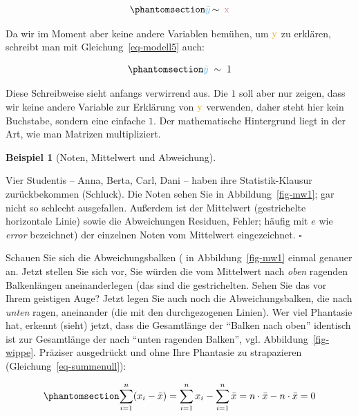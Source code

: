 \documentclass[
  letterpaper,
  oneside,
  open=any]{scrbook}
\theoremstyle{definition}
\theoremstyle{definition}
\newtheorem{example}{Beispiel}[chapter]
\theoremstyle{definition}
\theoremstyle{remark}
\begin{document}
\begin{equation}\phantomsection\label{eq-modell5a}{\color{modelcol}{\bar{y}} \color{black}  {\, \sim \,} \color{xcol}{\text{ x}}}\end{equation}

Da wir im Moment aber keine andere Variablen bemühen, um
\(\color{ycol}{\text{y}}\) zu erklären, schreibt man mit
Gleichung~\ref{eq-modell5} auch:

\begin{equation}\phantomsection\label{eq-modell5}{\color{modelcol}{\bar{y}}\;\;  \color{black}{\sim \; 1}}\end{equation}

Diese Schreibweise sieht anfangs verwirrend aus. Die \(1\) soll aber nur
zeigen, dass wir keine andere Variable zur Erklärung von
\(\color{ycol}{\text{y}}\) verwenden, daher steht hier kein Buchstabe,
sondern eine einfache \(1\). Der mathematische Hintergrund liegt in der
Art, wie man Matrizen multipliziert.

\begin{example}[Noten, Mittelwert und
Abweichung]\protect\hypertarget{exm-noten}{}\label{exm-noten}

Vier Studentis -- Anna, Berta, Carl, Dani -- haben ihre
Statistik-Klausur zurückbekommen (Schluck). Die Noten sehen Sie in
Abbildung~\ref{fig-mw1}; gar nicht so schlecht ausgefallen. Außerdem ist
der Mittelwert (gestrichelte horizontale Linie) sowie die Abweichungen
Residuen, Fehler; häufig mit \(e\) wie \emph{error} bezeichnet) der
einzelnen Noten vom Mittelwert eingezeichnet. \(\square\)

\end{example}

Schauen Sie sich die Abweichungsbalken ( in Abbildung~\ref{fig-mw1}
einmal genauer an. Jetzt stellen Sie sich vor, Sie würden die vom
Mittelwert nach \emph{oben} ragenden Balkenlängen aneinanderlegen (das
sind die gestrichelten. Sehen Sie das vor Ihrem geistigen Auge? Jetzt
legen Sie auch noch die Abweichungsbalken, die nach \emph{unten} ragen,
aneinander (die mit den durchgezogenen Linien). Wer viel Phantasie hat,
erkennt (sieht) jetzt, dass die Gesamtlänge der \enquote{Balken nach
oben} identisch ist zur Gesamtlänge der nach \enquote{unten ragenden
Balken}, vgl. Abbildung~\ref{fig-wippe}. Präziser ausgedrückt und ohne
Ihre Phantasie zu strapazieren (Gleichung~\ref{eq-summenull}):

\begin{equation}\phantomsection\label{eq-summenull}{\sum_{i=1}^n (x_i-\bar{x})=\sum_{i=1}^n x_i - \sum_{i=1}^n \bar{x} = n\cdot \bar{x} - n\cdot \bar{x}=0}\end{equation}
\end{document}
